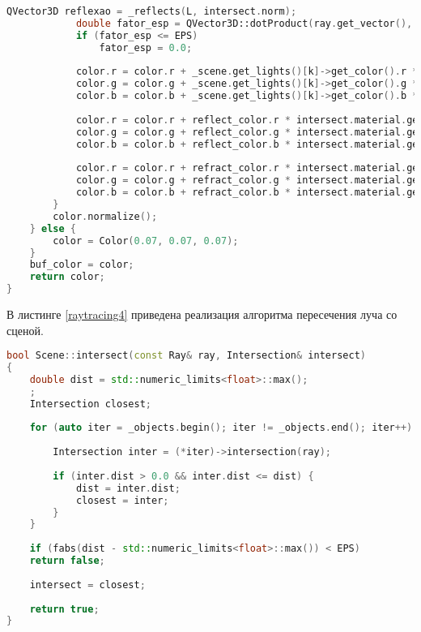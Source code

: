 \begin{lstlisting}[label=raytracing3,caption=Реализация алгоритма испускания луча (конец), language=C++]
			QVector3D reflexao = _reflects(L, intersect.norm);
			double fator_esp = QVector3D::dotProduct(ray.get_vector(), reflexao);
			if (fator_esp <= EPS)
				fator_esp = 0.0;
			
			color.r = color.r + _scene.get_lights()[k]->get_color().r * _scene.get_lights()[k]->get_intensity() * pow(fator_esp, intersect.material.get_k()) * intersect.material.get_specular().r * intersect.material.get_ks();
			color.g = color.g + _scene.get_lights()[k]->get_color().g * _scene.get_lights()[k]->get_intensity() * pow(fator_esp, intersect.material.get_k()) * intersect.material.get_specular().g * intersect.material.get_ks();
			color.b = color.b + _scene.get_lights()[k]->get_color().b * _scene.get_lights()[k]->get_intensity() * pow(fator_esp, intersect.material.get_k()) * intersect.material.get_specular().b * intersect.material.get_ks();
			
			color.r = color.r + reflect_color.r * intersect.material.get_k_refl();
			color.g = color.g + reflect_color.g * intersect.material.get_k_refl();
			color.b = color.b + reflect_color.b * intersect.material.get_k_refl();
			
			color.r = color.r + refract_color.r * intersect.material.get_k_refr();
			color.g = color.g + refract_color.g * intersect.material.get_k_refr();
			color.b = color.b + refract_color.b * intersect.material.get_k_refr();
		}
		color.normalize();
	} else {
		color = Color(0.07, 0.07, 0.07);
	}
	buf_color = color;
	return color;
}
\end{lstlisting}

В листинге \ref{raytracing4}  приведена реализация алгоритма пересечения луча со сценой.

\begin{lstlisting}[label=raytracing4,caption=Реализация алгоритма пересечения луча со сценой, language=C++]
bool Scene::intersect(const Ray& ray, Intersection& intersect)
{
	double dist = std::numeric_limits<float>::max();
	;
	Intersection closest;
	
	for (auto iter = _objects.begin(); iter != _objects.end(); iter++) {
		
		Intersection inter = (*iter)->intersection(ray);
		
		if (inter.dist > 0.0 && inter.dist <= dist) {
			dist = inter.dist;
			closest = inter;
		}
	}
	
	if (fabs(dist - std::numeric_limits<float>::max()) < EPS)
	return false;
	
	intersect = closest;
	
	return true;
}
\end{lstlisting}

